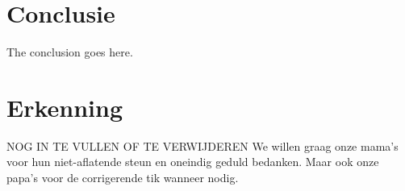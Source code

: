\documentclass[conference]{IEEEtran}
\begin{document}
\section{Conclusie}
The conclusion goes here.






\section*{Erkenning}

NOG IN TE VULLEN OF TE VERWIJDEREN
We willen graag onze mama's voor hun niet-aflatende steun en oneindig geduld bedanken. Maar ook onze papa's voor de corrigerende tik wanneer nodig.







%
%
%
\begin{thebibliography}{1}


\end{thebibliography}

%
%



\end{document}
